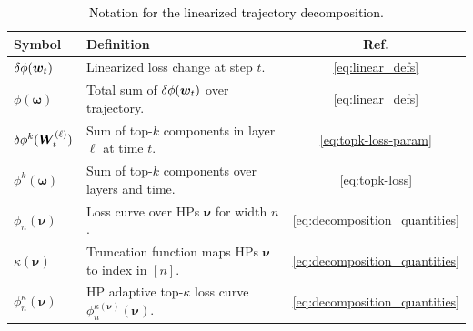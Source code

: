 \documentclass{article} %
\newcommand{\rev}[1]{\textcolor{black}{#1}}
\newcommand{\bhp}{\bm{\nu}}                       %
\newcommand{\hptrunc}{\kappa}
\newcommand{\traj}{\bm{\omega}}
\begin{document}
\begin{table}[t]
\vspace{-4mm}
    \centering
    \caption{\rev{\small Notation for the linearized trajectory decomposition.}}
    \vspace{-2mm}
    \label{tab:phi_notation}
    \small
    \begin{tabular}{@{}llc@{}}
        \toprule
        \textbf{Symbol} & \textbf{Definition} & \textbf{Ref.} \\
        \midrule
        $\delta \phi({\boldsymbol w}_t)$ & Linearized loss change at step $t$. & \eqref{eq:linear_defs} \\
        $\phi(\traj)$ & Total sum of $\delta \phi({\boldsymbol w}_t)$ over trajectory. & \eqref{eq:linear_defs} \\
        $\delta \phi^k({\boldsymbol W}^{(\ell)}_t)$ & Sum of top-$k$ components in layer $\ell$ at time $t$. & \eqref{eq:topk-loss-param} \\
        $\phi^k(\traj)$ & Sum of top-$k$ components over layers and time. & \eqref{eq:topk-loss} \\
        \midrule
        $\phi_n(\bhp)$ & Loss curve over HPs $\bhp$ for width $n$. & \eqref{eq:decomposition_quantities} \\
        $\hptrunc(\bhp)$ & Truncation function maps HPs $\bhp$ to index in $[n]$. & \eqref{eq:decomposition_quantities} \\
        $\phi_n^\hptrunc(\bhp)$ & HP adaptive top-$\hptrunc$ loss curve $\phi_n^{\hptrunc(\bhp)}(\bhp)$. & \eqref{eq:decomposition_quantities} \\
        \bottomrule
    \end{tabular}
    \vspace{-1mm}
\end{table}
\end{document}
